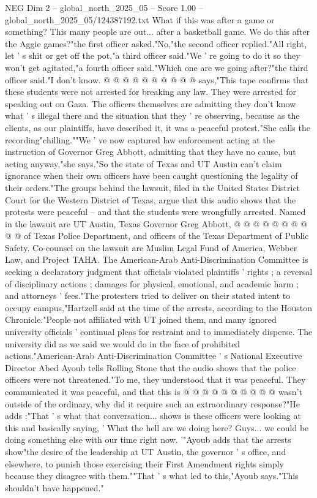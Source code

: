 \begin{textsample}{NEG Dim 2 – global\_north\_2025\_05 – Score 1.00 – global\_north\_2025\_05/124387192.txt}
What if this was after a game or something?
This many people are out... after a basketball game.
We do this after the Aggie games?"the first officer asked."No,"the second officer replied."All right, let ' s shit or get off the pot,"a third officer said."We ' re going to do it so they won't get agitated,"a fourth officer said."Which one are we going after?"the third officer said."I don't know. @ @ @ @ @ @ @ @ @ @ says,"This tape confirms that these students were not arrested for breaking any law.
They were arrested for speaking out on Gaza.
The officers themselves are admitting they don't know what ' s illegal there and the situation that they ' re observing, because as the clients, as our plaintiffs, have described it, it was a peaceful protest."She calls the recording"chilling.""We ' ve now captured law enforcement acting at the instruction of Governor Greg Abbott, admitting that they have no cause, but acting anyway,"she says."So the state of Texas and UT Austin can't claim ignorance when their own officers have been caught questioning the legality of their orders."The groups behind the lawsuit, filed in the United States District Court for the Western District of Texas, argue that this audio shows that the protests were peaceful -- and that the students were wrongfully arrested.
Named in the lawsuit are UT Austin, Texas Governor Greg Abbott, @ @ @ @ @ @ @ @ @ @ of Texas Police Department, and officers of the Texas Department of Public Safety.
Co-counsel on the lawsuit are Muslim Legal Fund of America, Webber Law, and Project TAHA.
The American-Arab Anti-Discrimination Committee is seeking a declaratory judgment that officials violated plaintiffs ' rights ; a reversal of disciplinary actions ; damages for physical, emotional, and academic harm ; and attorneys ' fees."The protesters tried to deliver on their stated intent to occupy campus,"Hartzell said at the time of the arrests, according to the Houston Chronicle."People not affiliated with UT joined them, and many ignored university officials ' continual pleas for restraint and to immediately disperse.
The university did as we said we would do in the face of prohibited actions."American-Arab Anti-Discrimination Committee ' s National Executive Director Abed Ayoub tells Rolling Stone that the audio shows that the police officers were not threatened."To me, they understood that it was peaceful.
They communicated it was peaceful, and that this is @ @ @ @ @ @ @ @ @ @ wasn't outside of the ordinary, why did it require such an extraordinary response?"He adds :"That ' s what that conversation... shows is these officers were looking at this and basically saying, ' What the hell are we doing here?
Guys... we could be doing something else with our time right now. '"Ayoub adds that the arrests show"the desire of the leadership at UT Austin, the governor ' s office, and elsewhere, to punish those exercising their First Amendment rights simply because they disagree with them.""That ' s what led to this,"Ayoub says."This shouldn't have happened."

\end{textsample}
